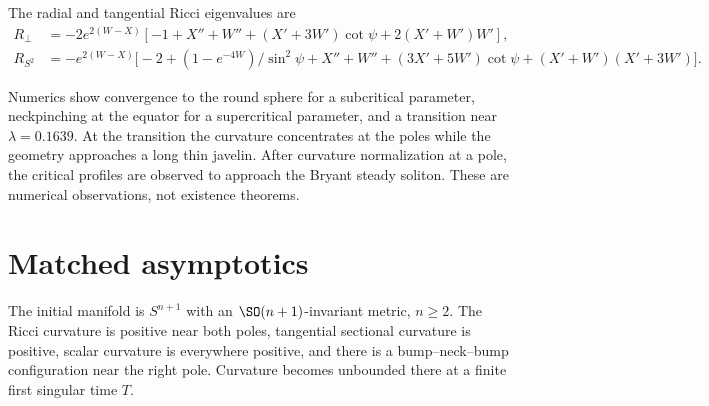 \begin{definition}
\label{def:chow-iv-rotational-ricci-eigenvalues}
The radial and tangential Ricci eigenvalues are
\begin{align*}
 R_\perp&=-2e^{2(W-X)}[-1+X''+W''+(X'+3W')\cot\psi+2(X'+W')W'],\\
 R_{S^2}&=-e^{2(W-X)}\bigl[-2+(1-e^{-4W})/\sin^2\psi+X''+W''
 +(3X'+5W')\cot\psi +(X'+W')(X'+3W')\bigr].
\end{align*}
\end{definition}

\begin{remark}
\label{rem:chow-iv-numerical-phase-transition}
Numerics show convergence to the round sphere for a subcritical parameter,
neckpinching at the equator for a supercritical parameter, and a transition
near $\lambda=0.1639$.  At the transition the curvature concentrates at the
poles while the geometry approaches a long thin javelin.  After curvature
normalization at a pole, the critical profiles are observed to approach the
Bryant steady soliton.  These are numerical observations, not existence
theorems.
\end{remark}

\section{Matched asymptotics}

\begin{definition}
\label{def:chow-iv-primary-degenerate-neckpinch-ansatz}
The initial manifold is $S^{n+1}$ with an $\SO(n+1)$-invariant metric,
$n\ge2$.  The Ricci curvature is positive near both poles, tangential
sectional curvature is positive, scalar curvature is everywhere positive, and
there is a bump--neck--bump configuration near the right pole.  Curvature
becomes unbounded there at a finite first singular time $T$.
\end{definition}

